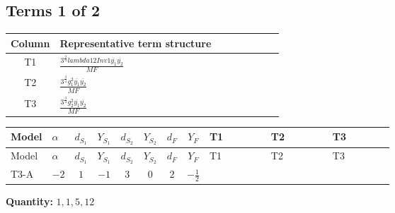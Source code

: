 \documentclass[8pt]{article}
\begin{document}
\begin{landscape}
\subsection*{Terms 1 of 2}
\begin{center}
\begin{tabular}{@{}c >{\raggedright\arraybackslash}p{0.82\linewidth}@{}}
\toprule
Column & Representative term structure \\
\midrule
T1 & \(\displaystyle \frac{3^{\frac{3}{4}} lambda12Inv1 \overline{y_{1}} \overline{y_{2}}}{MF}\) \\
\midrule
T2 & \(\displaystyle \frac{3^{\frac{3}{4}} g_{1}^{2} \overline{y_{1}} \overline{y_{2}}}{MF}\) \\
\midrule
T3 & \(\displaystyle \frac{3^{\frac{3}{4}} g_{2}^{2} \overline{y_{1}} \overline{y_{2}}}{MF}\) \\
\midrule
\bottomrule
\end{tabular}
\end{center}
\smallskip
\tiny
\begin{longtable}{@{}llcccccc >{\raggedright\arraybackslash}p{0.21\linewidth} >{\raggedright\arraybackslash}p{0.21\linewidth} >{\raggedright\arraybackslash}p{0.21\linewidth}@{}}
\toprule
Model & $\alpha$ & $d_{S_1}$ & $Y_{S_1}$ & $d_{S_2}$ & $Y_{S_2}$ & $d_F$ & $Y_F$ & T1 & T2 & T3 \\
\midrule
\endfirsthead
\toprule
Model & $\alpha$ & $d_{S_1}$ & $Y_{S_1}$ & $d_{S_2}$ & $Y_{S_2}$ & $d_F$ & $Y_F$ & T1 & T2 & T3 \\
\midrule
\endhead
T3-A & $-2$ & $1$ & $-1$ & $3$ & $0$ & $2$ & $-\frac{1}{2}$ & \scriptsize\adjustbox{max width=\linewidth}{$\begin{gathered} \frac{3^{\frac{3}{4}} lambda12Inv1 \overline{y_{1}} \overline{y_{2}}}{6 MF}\end{gathered}$} & \scriptsize\adjustbox{max width=\linewidth}{$\begin{gathered} \frac{3^{\frac{3}{4}} g_{1}^{2} \overline{y_{1}} \overline{y_{2}}}{8 MF}\end{gathered}$} & \scriptsize\adjustbox{max width=\linewidth}{$\begin{gathered} \frac{17 \cdot 3^{\frac{3}{4}} g_{2}^{2} \overline{y_{1}} \overline{y_{2}}}{24 MF}\end{gathered}$} \\
\midrule
\bottomrule
\end{longtable}
\clearpage
\noindent\textbf{Quantity: }$\mathrm{1,1,5,12}$\par\smallskip

\end{landscape}
\end{document}
